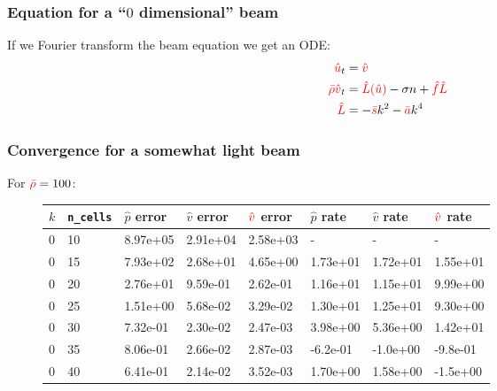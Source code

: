\documentclass[8pt]{beamer}
\newcommand{\leftd}[1]{{\color{red} \bar{#1}}}
\newcommand{\leftFourier}[1]{{\color{red} \hat{#1}}}
\newcommand{\leftFourierTwo}[2]{{\color{red} \hat{#1}(\hat{#2})}}
\begin{document}
\begin{frame}
    \frametitle{Equation for a ``\(0\) dimensional'' beam}
    If we Fourier transform the beam equation we get an ODE:
    \begin{align}
        \leftFourier{u}_t              &= \leftFourier{v}                     \\
        \leftd{\rho} \leftFourier{v}_t &= \leftFourierTwo{L}{u}
        - \sigma n + \leftFourier{f} \leftFourier{L}                          \\
        \leftFourier{L} &= -\leftd{s} k^2 - \leftd{a} k^4
    \end{align}
\end{frame}

\begin{frame}
    \frametitle{Convergence for a somewhat light beam}
    For \(\leftd{\rho} = 100\):
    \begin{figure}
        \centering
        \begin{tabular}{| l | l | l | l | l | l | l | l |}
            \hline
            \(k\) & \texttt{n\_cells} &
            \(\hat{p}\) error & \(\hat{v}\) error & \(\leftFourier{v}\) error &
            \(\hat{p}\) rate & \(\hat{v}\) rate & \(\leftFourier{v}\) rate    \\
            \hline
            0  & 10 & 8.97e+05 & 2.91e+04 & 2.58e+03 & - & - & -              \\
            0  & 15 & 7.93e+02 & 2.68e+01 & 4.65e+00 & 1.73e+01 & 1.72e+01 &
            1.55e+01                                                          \\
            0  & 20 & 2.76e+01 & 9.59e-01 & 2.62e-01 & 1.16e+01 & 1.15e+01 &
            9.99e+00                                                          \\
            0  & 25 & 1.51e+00 & 5.68e-02 & 3.29e-02 & 1.30e+01 & 1.25e+01 &
            9.30e+00                                                          \\
            0  & 30 & 7.32e-01 & 2.30e-02 & 2.47e-03 & 3.98e+00 & 5.36e+00 &
            1.42e+01                                                          \\
            0  & 35 & 8.06e-01 & 2.66e-02 & 2.87e-03 & -6.2e-01 & -1.0e+00 &
            -9.8e-01                                                          \\
            0  & 40 & 6.41e-01 & 2.14e-02 & 3.52e-03 & 1.70e+00 & 1.58e+00 &
            -1.5e+00                                                          \\

\end{tabular}
\end{figure}
\end{frame}
\end{document}
